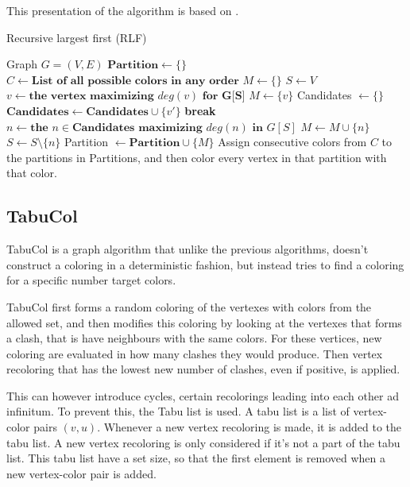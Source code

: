 \documentclass{amsart}
\newcommand{\algorithmicbreak}{\textbf{break}}
\newcommand{\BREAK}{\STATE \algorithmicbreak}
\begin{document}
This presentation of the algorithm is based on \cite{Constructive}.
\begin{algorithm}[H]
    \caption{Recursive largest first (RLF)}
  \begin{algorithmic}[1]
      \REQUIRE Graph $G = (V,E)$
      \STATE $\textbf{Partition} \leftarrow \{\}$
      \STATE $C \leftarrow \textbf{List of all possible colors in any order}$
      \STATE $M \leftarrow \{\}$
      \STATE $S \leftarrow V$
        \STATE $v \leftarrow \textbf{the vertex maximizing $deg(v)$ for G[S]} $
        \STATE $M \leftarrow \{v\}$
            \STATE Candidates $\leftarrow \{\}$
                    \STATE $\textbf{Candidates} \leftarrow \textbf{Candidates}
                    \cup \{v'\}$
                \ENDIF
            \ENDFOR
                \BREAK
            \ENDIF
            \STATE $n \leftarrow \textbf{the $n \in \textbf{Candidates}$ maximizing $deg(n)$ in $G[S]$}$ 
            \STATE $M \leftarrow M \cup \{n\}$
            \STATE $S \leftarrow S \setminus \{n\}$
        \ENDWHILE
        \STATE Partition $\leftarrow \textbf{Partition} \cup \{M\}$ 
      \ENDWHILE
      \STATE Assign consecutive colors from $C$ to the partitions in Partitions,
      and then color every vertex in that partition with that color.
  \end{algorithmic}
\end{algorithm}

\subsection{TabuCol}

TabuCol is a graph algorithm that unlike the previous algorithms, doesn't
construct a coloring in a deterministic fashion, but instead tries to find a
coloring for a specific number target colors.

TabuCol first forms a random coloring of the vertexes with colors from the
allowed set, and then modifies this coloring by looking at the vertexes that
forms a clash, that is have neighbours with the same colors. For these vertices,
new coloring are evaluated in how many clashes they would produce. Then vertex
recoloring that has the lowest new number of clashes, even if positive, is
applied.

This can however introduce cycles, certain recolorings leading into each other
ad infinitum. To prevent this, the Tabu list is used. A tabu list is a list 
of vertex-color pairs $(v,u)$. Whenever a new vertex recoloring is made, it is
added to the tabu list. A new vertex recoloring is only considered if it's not a
part of the tabu list. This tabu list have a set size, so that the first element
is removed when a new vertex-color pair is added.
\end{document}
